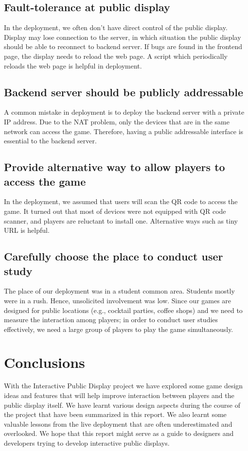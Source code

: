 \documentclass{sig-alternate}
\begin{document}
\subsection{Fault-tolerance at public display}
In the deployment, we often don't have
direct control of the public display. Display may lose connection to
the server, in which situation the public display should be able to reconnect to 
backend server. If bugs are found in the frontend page, the display needs to 
reload the web page. A script which periodically reloads the web page is helpful 
in deployment.

\subsection{Backend server should be publicly addressable}
A common mistake in 
deployment is to deploy the backend server with a private IP address. Due to 
the NAT problem, only the devices that are in the same network can access the 
game. Therefore, having a public addressable interface is essential to the backend server.

\subsection{Provide alternative way to allow players to access the game}
In the deployment, we assumed 
that users will scan the QR code to access the game. It turned out that most of devices 
were not equipped with QR code scanner, and players are reluctant to install one. 
Alternative ways such as tiny URL is helpful. 

\subsection{Carefully choose the place to conduct user study}
The place of our deployment was in 
a student common area. Students mostly were in a rush. Hence, unsolicited involvement 
was low. Since our games are designed for public locations (e.g., cocktail parties, coffee shops) and we need to measure the interaction among players; in order to conduct user studies effectively, we need a large group of players to play the game simultaneously.

\section{Conclusions}
With the Interactive Public Display project we have explored some game design ideas and features that will help 
improve interaction between players and the public display itself. We have learnt various design aspects during 
the course of the project that have been summarized in this report. We also learnt some valuable lessons from the 
live deployment that are often underestimated and overlooked. We hope that this report might serve as a guide to 
designers and developers trying to develop interactive public displays.
\end{document}
